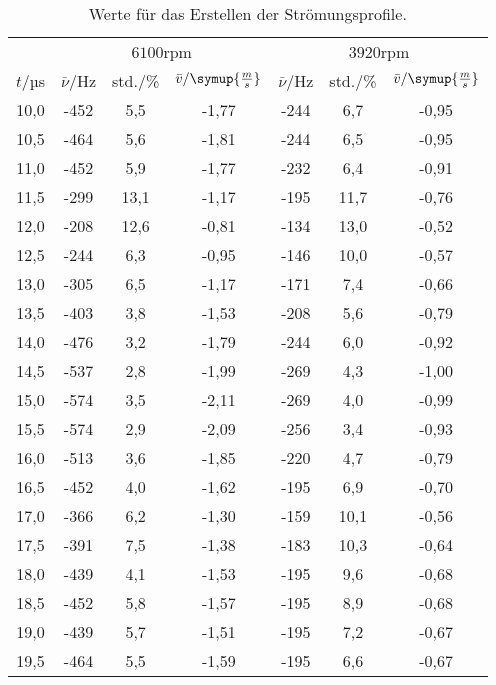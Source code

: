 \begin{table}[htp]
        \begin{center}
          \caption{Werte für das Erstellen der Strömungsprofile.}
          \label{tab:profil}
                \begin{tabular}{ccccccc}
                \toprule
                & \multicolumn{3}{c}{$6100$rpm} & \multicolumn{3}{c}{$3920$rpm} \\\cmidrule(lr){2-4}\cmidrule(lr){5-7}
                        {$t/$µs} & {$\bar{\nu}/$Hz} & {std./\%} & {$\bar{v}/\symup{\frac{m}{s}}$} & {$\bar{\nu}/$Hz} & {std./\%} & {$\bar{v}/\symup{\frac{m}{s}}$}\\
                        \midrule
                        10,0 & -452 &  5,5 & -1,77 & -244 &  6,7 & -0,95\\
                        10,5 & -464 &  5,6 & -1,81 & -244 &  6,5 & -0,95\\
                        11,0 & -452 &  5,9 & -1,77 & -232 &  6,4 & -0,91\\
                        11,5 & -299 & 13,1 & -1,17 & -195 & 11,7 & -0,76\\
                        12,0 & -208 & 12,6 & -0,81 & -134 & 13,0 & -0,52\\
                        12,5 & -244 &  6,3 & -0,95 & -146 & 10,0 & -0,57\\
                        13,0 & -305 &  6,5 & -1,17 & -171 &  7,4 & -0,66\\
                        13,5 & -403 &  3,8 & -1,53 & -208 &  5,6 & -0,79\\
                        14,0 & -476 &  3,2 & -1,79 & -244 &  6,0 & -0,92\\
                        14,5 & -537 &  2,8 & -1,99 & -269 &  4,3 & -1,00\\
                        15,0 & -574 &  3,5 & -2,11 & -269 &  4,0 & -0,99\\
                        15,5 & -574 &  2,9 & -2,09 & -256 &  3,4 & -0,93\\
                        16,0 & -513 &  3,6 & -1,85 & -220 &  4,7 & -0,79\\
                        16,5 & -452 &  4,0 & -1,62 & -195 &  6,9 & -0,70\\
                        17,0 & -366 &  6,2 & -1,30 & -159 & 10,1 & -0,56\\
                        17,5 & -391 &  7,5 & -1,38 & -183 & 10,3 & -0,64\\
                        18,0 & -439 &  4,1 & -1,53 & -195 &  9,6 & -0,68\\
                        18,5 & -452 &  5,8 & -1,57 & -195 &  8,9 & -0,68\\
                        19,0 & -439 &  5,7 & -1,51 & -195 &  7,2 & -0,67\\
                        19,5 & -464 &  5,5 & -1,59 & -195 &  6,6 & -0,67\\
                \bottomrule
                \end{tabular}
        \end{center}
\end{table}

